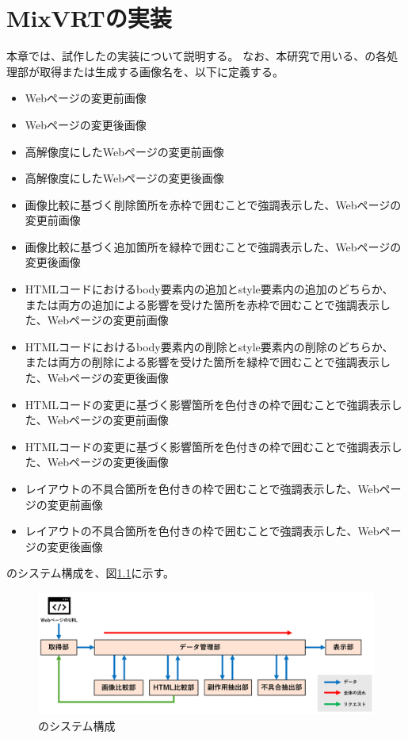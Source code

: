 \chapter{MixVRTの実装}\label{cha:Implementation}
本章では、試作した\toolName の実装について説明する。
なお、本研究で用いる、\toolName の各処理部が取得または生成する画像名を、以下に定義する。
\begin{itemize}
    \item Webページの変更前画像
    \item Webページの変更後画像
    \item 高解像度にしたWebページの変更前画像
    \item 高解像度にしたWebページの変更後画像
    \item 画像比較に基づく削除箇所を赤枠で囲むことで強調表示した、Webページの変更前画像
    \item 画像比較に基づく追加箇所を緑枠で囲むことで強調表示した、Webページの変更後画像
    \item HTMLコードにおけるbody要素内の追加とstyle要素内の追加のどちらか、
          または両方の追加による影響を受けた箇所を赤枠で囲むことで強調表示した、Webページの変更前画像
    \item HTMLコードにおけるbody要素内の削除とstyle要素内の削除のどちらか、
          または両方の削除による影響を受けた箇所を緑枠で囲むことで強調表示した、Webページの変更後画像
    \item HTMLコードの変更に基づく影響箇所を色付きの枠で囲むことで強調表示した、Webページの変更前画像
    \item HTMLコードの変更に基づく影響箇所を色付きの枠で囲むことで強調表示した、Webページの変更後画像
    \item レイアウトの不具合箇所を色付きの枠で囲むことで強調表示した、Webページの変更前画像
    \item レイアウトの不具合箇所を色付きの枠で囲むことで強調表示した、Webページの変更後画像
\end{itemize}
\par
\toolName のシステム構成を、図\ref{fig:System}に示す。
\begin{figure}[tp]
    \begin{center}
        \includegraphics[width=1.0\columnwidth]{image/4_System_2.png}
        \caption{\toolName のシステム構成}
        \label{fig:System}
    \end{center}
\end{figure}
